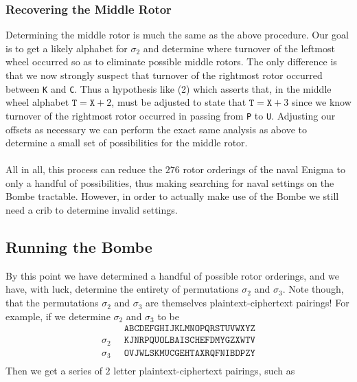 \subsubsection{Recovering the Middle Rotor}
Determining the middle rotor is much the same as the above procedure. Our goal is to get a likely alphabet for $\sigma_2$ and determine where turnover of the leftmost wheel occurred so as to eliminate possible middle rotors. The only difference is that we now strongly suspect that turnover of the rightmost rotor occurred between \texttt{K} and \texttt{C}. Thus a hypothesis like (2) which asserts that, in the middle wheel alphabet $\texttt{T} = \texttt{X} + 2$, must be adjusted to state that $\texttt{T} = \texttt{X} + 3$ since we know turnover of the rightmost rotor occurred in passing from \texttt{P} to \texttt{U}. Adjusting our offsets as necessary we can perform the exact same analysis as above to determine a small set of possibilities for the middle rotor.
\\\\All in all, this process can reduce the $276$ rotor orderings of the naval Enigma to only a handful of possibilities, thus making searching for naval settings on the Bombe tractable. However, in order to actually make use of the Bombe we still need a crib to determine invalid settings.

\subsection{Running the Bombe}
By this point we have determined a handful of possible rotor orderings, and we have, with luck, determine the entirety of permutations $\sigma_2$ and $\sigma_3$. Note though, that the permutations $\sigma_2$ and $\sigma_3$ are themselves plaintext-ciphertext pairings! For example, if we determine $\sigma_2$ and $\sigma_3$ to be
\begin{align*}
	             & \texttt{ABCDEFGHIJKLMNOPQRSTUVWXYZ} \\
	\sigma_2\;\; & \texttt{KJNRPQUOLBAISCHEFDMYGZXWTV} \\
	\sigma_3\;\; & \texttt{OVJWLSKMUCGEHTAXRQFNIBDPZY} \\
\end{align*}
Then we get a series of $2$ letter plaintext-ciphertext pairings, such as

